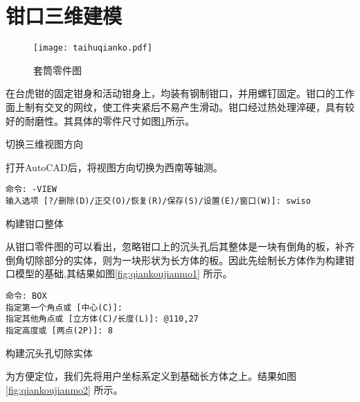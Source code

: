 \section{钳口三维建模}

\begin{figure}[htbp]
\centering
\texttt{[image: taihuqianko.pdf]}
\caption{套筒零件图}\label{fig:taihuqianko}
\end{figure}

在台虎钳的固定钳身和活动钳身上，均装有钢制钳口，并用螺钉固定。钳口的工作面上制有交叉的网纹，使工件夹紧后不易产生滑动。钳口经过热处理淬硬，具有较好的耐磨性。其具体的零件尺寸如图\ref{fig:taihuqianko}所示。

\begin{procedure}
\item 切换三维视图方向

打开AutoCAD后，将视图方向切换为西南等轴测。

\begin{lstlisting}
命令: -VIEW
输入选项 [?/删除(D)/正交(O)/恢复(R)/保存(S)/设置(E)/窗口(W)]: swiso
\end{lstlisting}

\item 构建钳口整体

从钳口零件图的可以看出，忽略钳口上的沉头孔后其整体是一块有倒角的板，补齐倒角切除部分的实体，则为一块形状为长方体的板。因此先绘制长方体作为构建钳口模型的基础,其结果如图\ref{fig:qiankoujianmo1} 所示。

\begin{lstlisting}
命令: BOX
指定第一个角点或 [中心(C)]:
指定其他角点或 [立方体(C)/长度(L)]: @110,27
指定高度或 [两点(2P)]: 8
\end{lstlisting}

\begin{figure}[htbp]
\centering
\begin{floatrow}[2]
\end{floatrow}

\end{figure}

\item 构建沉头孔切除实体

为方便定位，我们先将用户坐标系定义到基础长方体之上。结果如图\ref{fig:qiankoujianmo2} 所示。


\end{procedure}

